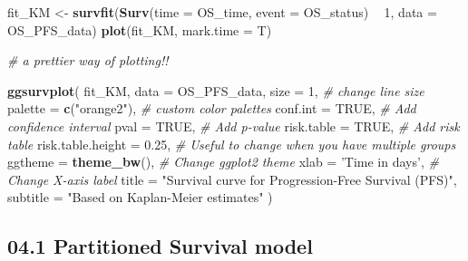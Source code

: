 \documentclass[
]{article}
\newenvironment{Shaded}{\begin{snugshade}}{\end{snugshade}}
\newcommand{\CommentTok}[1]{\textcolor[rgb]{0.56,0.35,0.01}{\textit{#1}}}
\newcommand{\DataTypeTok}[1]{\textcolor[rgb]{0.13,0.29,0.53}{#1}}
\newcommand{\DecValTok}[1]{\textcolor[rgb]{0.00,0.00,0.81}{#1}}
\newcommand{\FloatTok}[1]{\textcolor[rgb]{0.00,0.00,0.81}{#1}}
\newcommand{\KeywordTok}[1]{\textcolor[rgb]{0.13,0.29,0.53}{\textbf{#1}}}
\newcommand{\NormalTok}[1]{#1}
\newcommand{\OperatorTok}[1]{\textcolor[rgb]{0.81,0.36,0.00}{\textbf{#1}}}
\newcommand{\OtherTok}[1]{\textcolor[rgb]{0.56,0.35,0.01}{#1}}
\newcommand{\StringTok}[1]{\textcolor[rgb]{0.31,0.60,0.02}{#1}}
\begin{document}
\begin{Shaded}
\begin{Highlighting}[]
\NormalTok{fit_KM   <-}\StringTok{ }\KeywordTok{survfit}\NormalTok{(}\KeywordTok{Surv}\NormalTok{(}\DataTypeTok{time =}\NormalTok{ OS_time, }\DataTypeTok{event =}\NormalTok{ OS_status) }\OperatorTok{~}\StringTok{ }\DecValTok{1}\NormalTok{, }\DataTypeTok{data =}\NormalTok{ OS_PFS_data)}
\KeywordTok{plot}\NormalTok{(fit_KM, }\DataTypeTok{mark.time =}\NormalTok{ T)}

\CommentTok{# a prettier way of plotting!!}

\KeywordTok{ggsurvplot}\NormalTok{(}
\NormalTok{  fit_KM, }
  \DataTypeTok{data =}\NormalTok{ OS_PFS_data, }
  \DataTypeTok{size =} \DecValTok{1}\NormalTok{,                  }\CommentTok{# change line size}
  \DataTypeTok{palette =} \KeywordTok{c}\NormalTok{(}\StringTok{"orange2"}\NormalTok{),    }\CommentTok{# custom color palettes}
  \DataTypeTok{conf.int =} \OtherTok{TRUE}\NormalTok{,           }\CommentTok{# Add confidence interval}
  \DataTypeTok{pval =} \OtherTok{TRUE}\NormalTok{,               }\CommentTok{# Add p-value}
  \DataTypeTok{risk.table =} \OtherTok{TRUE}\NormalTok{,         }\CommentTok{# Add risk table}
  \DataTypeTok{risk.table.height =} \FloatTok{0.25}\NormalTok{,  }\CommentTok{# Useful to change when you have multiple groups}
  \DataTypeTok{ggtheme =} \KeywordTok{theme_bw}\NormalTok{(),      }\CommentTok{# Change ggplot2 theme}
  \DataTypeTok{xlab =} \StringTok{'Time in days'}\NormalTok{,     }\CommentTok{# Change X-axis label}
  \DataTypeTok{title    =} \StringTok{"Survival curve for Progression-Free Survival (PFS)"}\NormalTok{, }
  \DataTypeTok{subtitle =} \StringTok{"Based on Kaplan-Meier estimates"}
\NormalTok{) }
\end{Highlighting}
\end{Shaded}

\hypertarget{partitioned-survival-model}{%
\subsection{04.1 Partitioned Survival
model}\label{partitioned-survival-model}}
\end{document}
